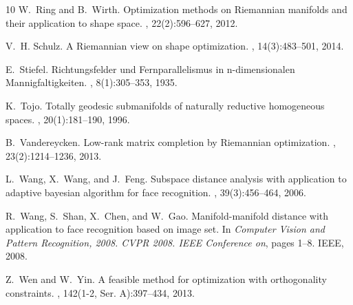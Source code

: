 \documentclass[11pt,reqno]{amsart}%
\theoremstyle{definition}
\theoremstyle{remark}
\begin{document}
\begin{thebibliography}{10}
W.~Ring and B.~Wirth.
\newblock Optimization methods on {R}iemannian manifolds and their application
  to shape space.
, 22(2):596--627, 2012.

V.~H. Schulz.
\newblock A {R}iemannian view on shape optimization.
, 14(3):483--501, 2014.

E.~Stiefel.
\newblock Richtungsfelder und {F}ernparallelismus in n-dimensionalen
  {M}annigfaltigkeiten.
, 8(1):305--353, 1935.

K.~Tojo.
\newblock Totally geodesic submanifolds of naturally reductive homogeneous
  spaces.
, 20(1):181--190, 1996.

B.~Vandereycken.
\newblock Low-rank matrix completion by {R}iemannian optimization.
, 23(2):1214--1236, 2013.

L.~Wang, X.~Wang, and J.~Feng.
\newblock Subspace distance analysis with application to adaptive bayesian
  algorithm for face recognition.
, 39(3):456--464, 2006.

R.~Wang, S.~Shan, X.~Chen, and W.~Gao.
\newblock Manifold-manifold distance with application to face recognition based
  on image set.
\newblock In {\em Computer Vision and Pattern Recognition, 2008. CVPR 2008.
  IEEE Conference on}, pages 1--8. IEEE, 2008.

Z.~Wen and W.~Yin.
\newblock A feasible method for optimization with orthogonality constraints.
, 142(1-2, Ser. A):397--434, 2013.

\end{thebibliography}
\end{document}

